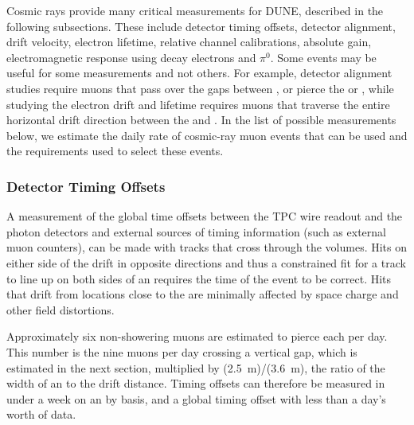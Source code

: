 Cosmic rays provide many critical measurements for DUNE, described in the following subsections. These include detector timing offsets, detector alignment, drift velocity, electron lifetime, relative channel calibrations, absolute gain,  electromagnetic response using decay electrons and $\pi^0$.
Some events may be useful for some measurements and not others.  For example, detector alignment studies require muons that pass over the gaps between
, or pierce the  or  , while studying the electron drift and lifetime requires muons
that traverse the entire horizontal drift direction between the  and .  In the list of
possible measurements below, we estimate the daily rate of cosmic-ray muon events that can be used
and the requirements used to select these events.

\subsubsection{Detector Timing Offsets}

A measurement of the global time offsets between the TPC wire readout and the photon detectors
and external sources of timing information (such as external muon counters), can be made
with tracks that cross through the  volumes.  Hits on either side of the  drift in opposite
directions and thus a constrained fit for a track to line up on both sides of an  requires the
time of the event to be correct.  Hits that drift from locations close to the  are minimally
affected by space charge and other field distortions.

Approximately six non-showering muons are estimated to pierce each  per day.  This number
is the nine muons per day crossing a vertical gap, which is estimated in the next section, multiplied
by (\SI{2.5}{\m})/(\SI{3.6}{\m}), the ratio of the width of an  to the drift distance.  Timing offsets can therefore
be measured in under a week on an  by  basis, and a global timing offset with less than a day's worth
of data.
 
